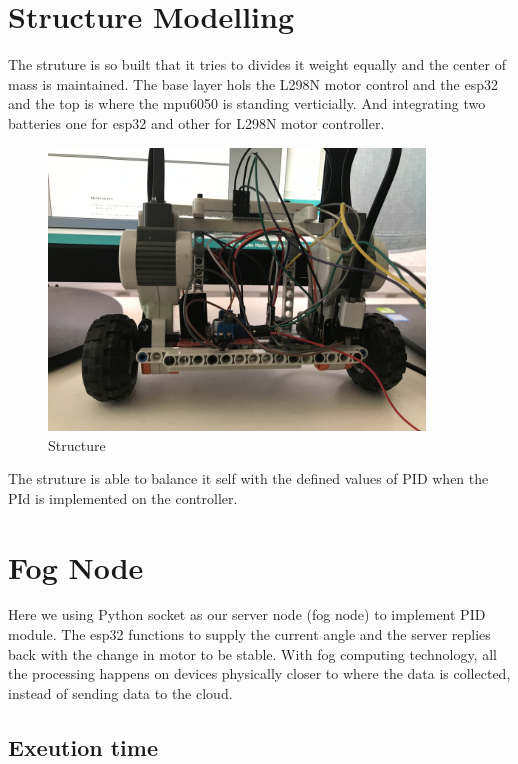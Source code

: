 \documentclass{article}
\begin{document}
  \section{Structure Modelling}
  The struture is so built that it tries to divides it weight equally and the center of mass is maintained. The base layer hols the L298N motor control and the esp32 and the top is where the mpu6050 is standing verticially. And integrating two batteries one for esp32 and other for L298N motor controller.
  
  	\begin{figure}[h]
 			\centering
 			\includegraphics[width=100mm,scale=0.5]{Structure}
 			\caption{Structure}
 			\label{Structure }
 		\end{figure}
 		
 	The struture is able to balance it self with the defined values of PID when the PId is implemented on the controller.
  
  \section{Fog Node}
  Here we using Python socket as our server node (fog node) to implement PID module. The esp32 functions to supply the current angle and the server replies back with the change in motor to be stable. 
  With fog computing technology, all the processing happens on devices physically closer to where the data is collected, instead of sending data to the cloud.
  
  \subsection{Exeution time}
  
\end{document}
